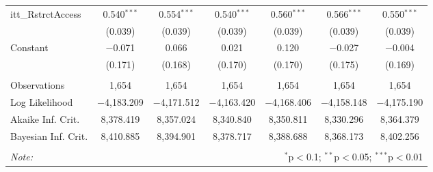 \begin{sidewaystable}[!htbp]
\begin{tabular}{@{\extracolsep{5pt}}lcccccc}
  itt\_RstrctAccess & 0.540$^{***}$ & 0.554$^{***}$ & 0.540$^{***}$ & 0.560$^{***}$ & 0.566$^{***}$ & 0.550$^{***}$ \\ 
  & (0.039) & (0.039) & (0.039) & (0.039) & (0.039) & (0.039) \\ 
  Constant & $-$0.071 & 0.066 & 0.021 & 0.120 & $-$0.027 & $-$0.004 \\ 
  & (0.171) & (0.168) & (0.170) & (0.170) & (0.175) & (0.169) \\ 
 \hline \\[-1.8ex] 
Observations & 1,654 & 1,654 & 1,654 & 1,654 & 1,654 & 1,654 \\ 
Log Likelihood & $-$4,183.209 & $-$4,171.512 & $-$4,163.420 & $-$4,168.406 & $-$4,158.148 & $-$4,175.190 \\ 
Akaike Inf. Crit. & 8,378.419 & 8,357.024 & 8,340.840 & 8,350.811 & 8,330.296 & 8,364.379 \\ 
Bayesian Inf. Crit. & 8,410.885 & 8,394.901 & 8,378.717 & 8,388.688 & 8,368.173 & 8,402.256 \\ 
\hline 
\hline \\[-1.8ex] 
\textit{Note:}  & \multicolumn{6}{r}{$^{*}$p$<$0.1; $^{**}$p$<$0.05; $^{***}$p$<$0.01} \\ 
\end{tabular} 
\end{sidewaystable} 
